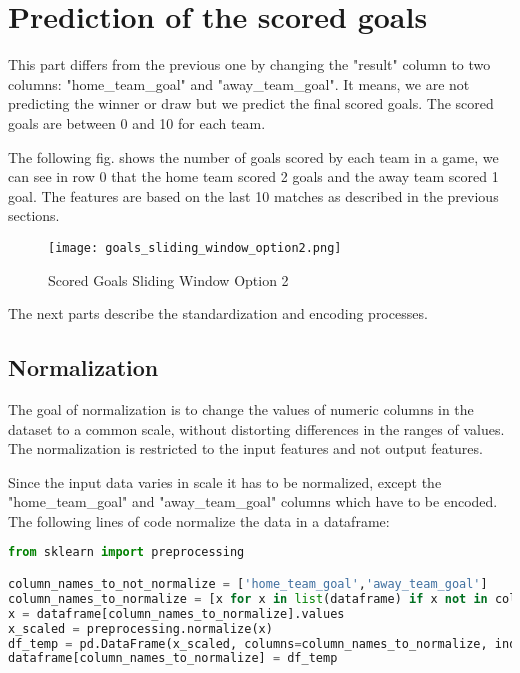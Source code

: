 \section {Prediction of the scored goals}

This part differs from the previous one by changing the "result" column to two columns: "home\_team\_goal" and "away\_team\_goal". It means, we are not predicting the winner or draw but we predict the final scored goals. The scored goals are between 0 and 10 for each team.


The following fig. shows the number of goals scored by each team in a game, we can see in row 0 that the home team scored 2 goals and the away team scored 1 goal. The features are based on the last 10 matches as described in the previous sections.


\begin{figure}[H]
\begin{center}
\texttt{[image: goals\_sliding\_window\_option2.png]}
\end{center}
\caption{Scored Goals Sliding Window Option 2}
\label{fig:scored_sliding_window_option2}
\end{figure}

The next parts describe the standardization and encoding processes.


\subsection {Normalization}
The goal of normalization is to change the values of numeric columns in the dataset to a common scale, without distorting differences in the ranges of values. The normalization is restricted to the input features and not output features.

Since the input data varies in scale it has to be normalized, except the "home\_team\_goal" and "away\_team\_goal" columns which have to be encoded.
The following lines of code normalize the data in a dataframe:

\begin{lstlisting}[language=Python, caption=Scored goals Python code for normalization]
from sklearn import preprocessing

column_names_to_not_normalize = ['home_team_goal','away_team_goal']
column_names_to_normalize = [x for x in list(dataframe) if x not in column_names_to_not_normalize ]
x = dataframe[column_names_to_normalize].values
x_scaled = preprocessing.normalize(x)
df_temp = pd.DataFrame(x_scaled, columns=column_names_to_normalize, index = dataframe.index)
dataframe[column_names_to_normalize] = df_temp
\end{lstlisting}


